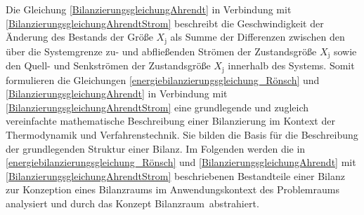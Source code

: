Die Gleichung \eqref{BilanzierungsgleichungAhrendt} in Verbindung mit \eqref{BilanzierungsgleichungAhrendtStrom} beschreibt die Geschwindigkeit der Änderung des Bestands der Größe
\(X_{\text{j}}\) als Summe der Differenzen zwischen den über die Systemgrenze zu- und abfließenden Strömen der Zustandsgröße
\(X_{\text{j}}\) sowie den Quell- und Senkströmen der Zustandsgröße \(X_{\text{j}}\) innerhalb des Systems.  
Somit formulieren die Gleichungen \eqref{energiebilanzierungsgleichung_Rönsch} und \eqref{BilanzierungsgleichungAhrendt} in Verbindung mit 
\eqref{BilanzierungsgleichungAhrendtStrom} eine grundlegende und zugleich vereinfachte mathematische Beschreibung einer Bilanzierung im Kontext der Thermodynamik und 
Verfahrenstechnik. Sie bilden die Basis für die Beschreibung der grundlegenden Struktur einer Bilanz.
Im Folgenden werden die in \eqref{energiebilanzierungsgleichung_Rönsch} und \eqref{BilanzierungsgleichungAhrendt} mit \eqref{BilanzierungsgleichungAhrendtStrom} 
beschriebenen Bestandteile einer Bilanz zur Konzeption eines Bilanzraums im Anwendungskontext des Problemraums analysiert und durch das Konzept \glqq Bilanzraum\grqq\ abstrahiert.